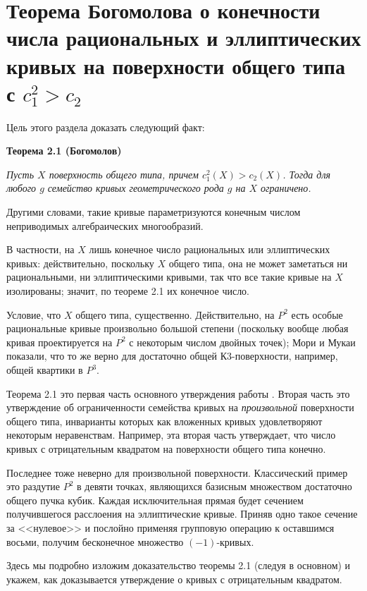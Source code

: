 \section{Теорема Богомолова о конечности числа рациональных и эллиптических кривых на поверхности общего типа с $c_1^2>c_2$}

Цель этого раздела доказать следующий факт:

\medskip
	{\bf Теорема 2.1 (Богомолов)}
	\begin{theorem}
		{\it
			Пусть $X$ поверхность общего типа, причем
			$c_1^2(X)>c_2(X)$. Тогда для любого $g$
			семейство кривых геометрического рода $g$ на $X$ ограничено.
		}
	\end{theorem}

\medskip
Другими словами, такие кривые параметризуются конечным числом
неприводимых алгебраических
многообразий.

В частности, на $X$ лишь конечное число рациональных или эллиптических
кривых: действительно, поскольку $X$ общего типа, она не может
заметаться ни рациональными, ни эллиптическими кривыми, так что все такие
кривые на $X$ изолированы; значит, по теореме 2.1 их конечное число.

Условие, что $X$ общего типа, существенно. Действительно, на $P^2$ есть
особые рациональные кривые произвольно большой степени
(поскольку вообще любая кривая проектируется на $P^2$ с некоторым числом
двойных точек); Мори и Мукаи показали, что то же верно для достаточно общей
К3-поверхности, например, общей квартики в $P^3$.

Теорема 2.1 это первая часть основного утверждения работы .
Вторая часть это утверждение об ограниченности семейства кривых на
\emph{произвольной} поверхности общего типа, инварианты которых как вложенных
кривых удовлетворяют некоторым неравенствам. Например, эта вторая часть
утверждает, что число кривых с отрицательным квадратом на поверхности
общего типа конечно.

Последнее тоже неверно для произвольной поверхности. Классический пример
это раздутие $P^2$ в девяти точках, являющихся базисным множеством
достаточно общего пучка
кубик. Каждая исключительная прямая будет сечением получившегося расслоения
на эллиптические кривые. Приняв одно такое сечение за <<нулевое>> и послойно применяя групповую
операцию к оставшимся восьми,
получим бесконечное множество $(-1)$-кривых.

Здесь мы подробно изложим доказательство теоремы 2.1 (следуя в основном) и укажем, как
доказывается утверждение о кривых с отрицательным квадратом.


